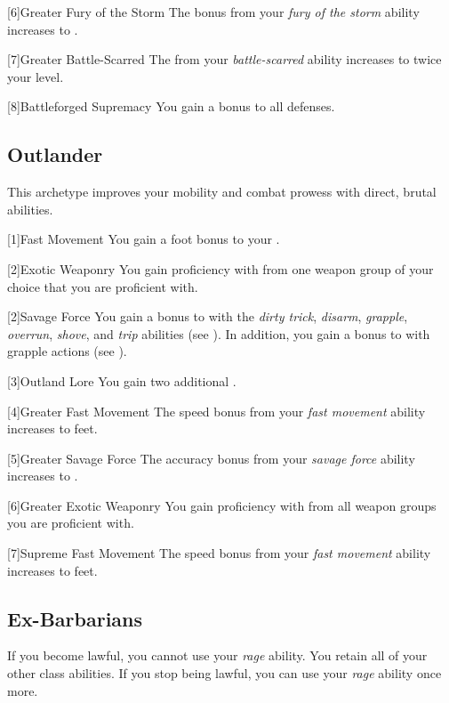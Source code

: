         [6]{Greater Fury of the Storm}
        The bonus from your \textit{fury of the storm} ability increases to .

        [7]{Greater Battle-Scarred}
        The  from your \textit{battle-scarred} ability increases to twice your level.

        [8]{Battleforged Supremacy}
        You gain a  bonus to all defenses.

    \subsection{Outlander}
        This archetype improves your mobility and combat prowess with direct, brutal abilities.

        [1]{Fast Movement} You gain a  foot bonus to your .

        [2]{Exotic Weaponry} You gain proficiency with  from one weapon group of your choice that you are proficient with.

        [2]{Savage Force} You gain a  bonus to  with the \textit{dirty trick}, \textit{disarm}, \textit{grapple}, \textit{overrun}, \textit{shove}, and \textit{trip} abilities (see ).
        In addition, you gain a  bonus to  with grapple actions (see ).

        [3]{Outland Lore} You gain two additional .

        [4]{Greater Fast Movement} The speed bonus from your \textit{fast movement} ability increases to  feet.

        [5]{Greater Savage Force} The accuracy bonus from your \textit{savage force} ability increases to .

        [6]{Greater Exotic Weaponry} You gain proficiency with  from all weapon groups you are proficient with.

        [7]{Supreme Fast Movement} The speed bonus from your \textit{fast movement} ability increases to  feet.

    \subsection{Ex-Barbarians}
        If you become lawful, you cannot use your \textit{rage} ability.
        You retain all of your other class abilities.
        If you stop being lawful, you can use your \textit{rage} ability once more.

